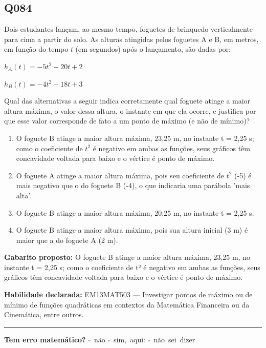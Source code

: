 \documentclass[11pt,a4paper]{article}
\begin{document}
\begin{samepage}
\subsection*{Q084}
Dois estudantes lançam, ao mesmo tempo, foguetes de brinquedo verticalmente para cima a partir do solo. As alturas atingidas pelos foguetes A e B, em metros, em função do tempo $t$ (em segundos) após o lançamento, são dadas por:

$h_A(t) = -5t^2 + 20t + 2$

$h_B(t) = -4t^2 + 18t + 3$

Qual das alternativas a seguir indica corretamente qual foguete atinge a maior altura máxima, o valor dessa altura, o instante em que ela ocorre, e justifica por que esse valor corresponde de fato a um ponto de máximo (e não de mínimo)?
\begin{enumerate}[label=(\alph*),nosep,leftmargin=*]
\item O foguete B atinge a maior altura máxima, 23,25 m, no instante t = 2,25 s; como o coeficiente de $t^2$ é negativo em ambas as funções, seus gráficos têm concavidade voltada para baixo e o vértice é ponto de máximo.
\item O foguete A atinge a maior altura máxima, pois seu coeficiente de $t^2$ (-5) é mais negativo que o do foguete B (-4), o que indicaria uma parábola 'mais alta'.
\item O foguete B atinge a maior altura máxima, 20,25 m, no instante t = 2,25 s.
\item O foguete B atinge a maior altura máxima, pois sua altura inicial (3 m) é maior que a do foguete A (2 m).
\end{enumerate}

\textbf{Gabarito proposto:} O foguete B atinge a maior altura máxima, 23,25 m, no instante t = 2,25 s; como o coeficiente de t² é negativo em ambas as funções, seus gráficos têm concavidade voltada para baixo e o vértice é ponto de máximo.

\textbf{Habilidade declarada:} EM13MAT503 --- Investigar pontos de máximo ou de mínimo de funções quadráticas em contextos da Matemática Financeira ou da Cinemática, entre outros.
\end{samepage}

\noindent\rule{\linewidth}{0.4pt}
\textbf{Tem erro matemático?}\quad
\mbox{$\square$~não} \quad \mbox{$\square$~sim, aqui:} \underline{\hspace{5cm}}
\quad \mbox{$\square$~não sei dizer}
\end{document}
